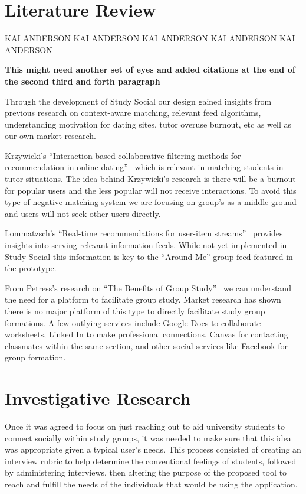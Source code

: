 \documentclass{sigchi-ext}
\begin{document}
\section{Literature Review}
KAI ANDERSON KAI ANDERSON KAI ANDERSON KAI ANDERSON KAI ANDERSON

\tellus
\textbf{This might need another set of eyes and added citations at the end of the second third and forth paragraph}

Through the development of Study Social our design gained insights from
previous research on context-aware matching, relevant feed algorithms,
understanding motivation for dating sites, tutor overuse burnout, etc as well
as our own market research.

Krzywicki's ``Interaction-based collaborative filtering methods for
recommendation in online dating''~\cite{krzywicki2010interaction} which is
relevant in matching students in tutor situations. The idea behind
Krzywicki's research is there will be a burnout for popular users and the
less popular will not receive interactions.  To avoid this type of negative
matching system we are focusing on group’s as a middle ground and users will
not seek other users directly.

Lommatzsch's ``Real-time recommendations for user-item
streams''~\cite{lommatzsch2015real} provides insights into serving relevant
information feeds. While not yet implemented in Study Social this information
is key to the ``Around Me'' group feed featured in the prototype.

From Petress's research on ``The Benefits of Group
Study''~\cite{petress2004benefits} we can understand the need for a platform
to facilitate group study. Market research has shown there is no major
platform of this type to directly facilitate study group formations. A few
outlying services include Google Docs to collaborate worksheets, Linked In to
make professional connections, Canvas for contacting classmates within the
same section, and other social services like Facebook for group formation.



\section{Investigative Research}
Once it was agreed to focus on just reaching out to aid university students
to connect socially within study groups, it was needed to make sure that
this idea was appropriate given a typical user's needs. This process
consisted of creating an interview rubric to help determine the
conventional feelings of students, followed by administering interviews,
then altering the purpose of the proposed tool to reach and fulfill the
needs of the individuals that would be using the application.
\end{document}
